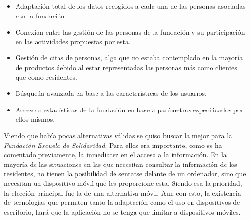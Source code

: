 \begin{itemize}
    \item Adaptación total de los datos recogidos a cada una de las personas asociadas con la fundación.
    \item Conexión entre las gestión de las personas de la fundación y su participación en las actividades propuestas por esta.
    \item Gestión de citas de personas, algo que no estaba contemplado en la mayoría de productos debido al estar representadas las personas más como clientes que como residentes.
    \item Búsqueda avanzada en base a las características de los usuarios.
    \item Acceso a estadísticas de la fundación en base a parámetros especificados por ellos mismos.
\end{itemize}

Viendo que había pocas alternativas válidas se quiso buscar la mejor para la \textit{Fundación Escuela de Solidaridad}. Para ellos era importante, como se ha comentado previamente, la inmediatez en el acceso a la información. En la mayoría de las situaciones en las que necesitan consultar la información de los residentes, no tienen la posibilidad de sentarse delante de un ordenador, sino que necesitan un dispositivo móvil que les proporcione esta. Siendo esa la prioridad, la elección principal fue la de una alternativa móvil. Aun con esto, la existencia de tecnologías que permiten tanto la adaptación como el uso en dispositivos de escritorio, hará que la aplicación no se tenga que limitar a dispositivos móviles.